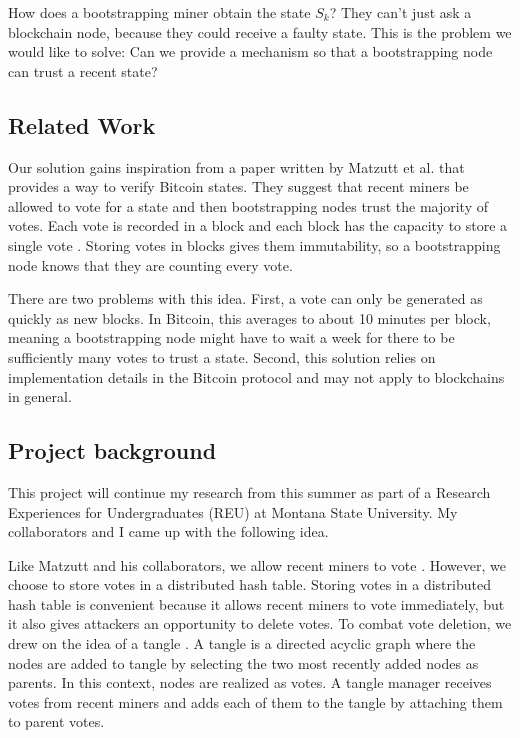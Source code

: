 How does a bootstrapping miner obtain the state $S_k$?
They can't just ask a blockchain node, because they could receive a faulty state.
This is the problem we would like to solve: Can we provide a mechanism so that a bootstrapping node can trust a recent state?

\subsection{Related Work}

Our solution gains inspiration from a paper written by Matzutt et al. that provides a way to verify Bitcoin states.
They suggest that recent miners be allowed to vote for a state and then bootstrapping nodes trust the majority of votes.
Each vote is recorded in a block and each block has the capacity to store a single vote \cite{matzutt2020HowTSPrune}.
Storing votes in blocks gives them immutability, so a bootstrapping node knows that they are counting every vote.

There are two problems with this idea.
First, a vote can only be generated as quickly as new blocks.
In Bitcoin, this averages to about 10 minutes per block, meaning a bootstrapping node might have to wait a week for there to be sufficiently many votes to trust a state.
Second, this solution relies on implementation details in the Bitcoin protocol and may not apply to blockchains in general.

\subsection{Project background}

This project will continue my research from this summer as part of a Research Experiences for Undergraduates (REU) at Montana State University.
My collaborators and I came up with the following idea.

Like Matzutt and his collaborators, we allow recent miners to vote \cite{matzutt2020HowTSPrune}.
However, we choose to store votes in a distributed hash table.
Storing votes in a distributed hash table is convenient because it allows recent miners to vote immediately, but it also gives attackers an opportunity to delete votes.
To combat vote deletion, we drew on the idea of a tangle \cite{popov2016tangle}.
A tangle is a directed acyclic graph where the nodes are added to tangle by selecting the two most recently added nodes as parents.
In this context, nodes are realized as votes.
A tangle manager receives votes from recent miners and adds each of them to the tangle by attaching them to parent votes.


